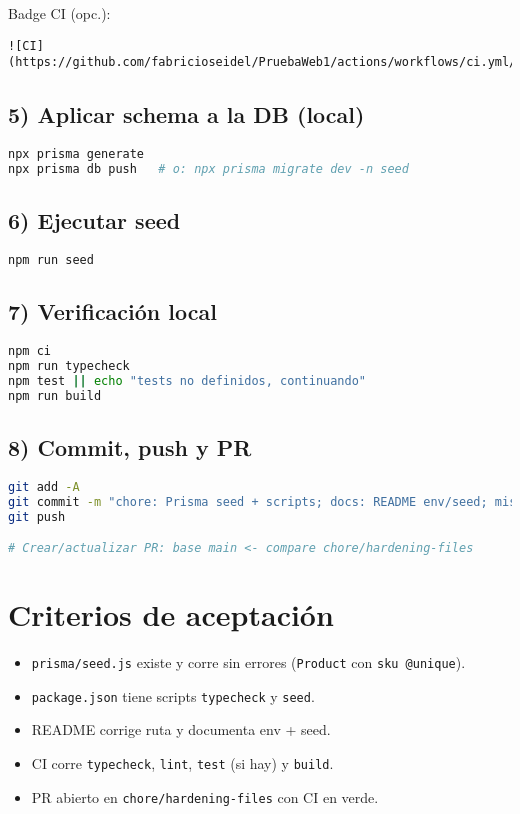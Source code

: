 \documentclass[11pt]{article}
\begin{document}
Badge CI (opc.): 
\begin{lstlisting}
![CI](https://github.com/fabricioseidel/PruebaWeb1/actions/workflows/ci.yml/badge.svg)
\end{lstlisting}

\subsection*{5) Aplicar schema a la DB (local)}
\begin{lstlisting}[language=bash]
npx prisma generate
npx prisma db push   # o: npx prisma migrate dev -n seed
\end{lstlisting}

\subsection*{6) Ejecutar seed}
\begin{lstlisting}[language=bash]
npm run seed
\end{lstlisting}

\subsection*{7) Verificación local}
\begin{lstlisting}[language=bash]
npm ci
npm run typecheck
npm test || echo "tests no definidos, continuando"
npm run build
\end{lstlisting}

\subsection*{8) Commit, push y PR}
\begin{lstlisting}[language=bash]
git add -A
git commit -m "chore: Prisma seed + scripts; docs: README env/seed; misc: typecheck"
git push

# Crear/actualizar PR: base main <- compare chore/hardening-files
\end{lstlisting}

\section*{Criterios de aceptación}
\begin{itemize}[leftmargin=*]
  \item \texttt{prisma/seed.js} existe y corre sin errores (\texttt{Product} con \texttt{sku @unique}).
  \item \texttt{package.json} tiene scripts \texttt{typecheck} y \texttt{seed}.
  \item README corrige ruta y documenta env + seed.
  \item CI corre \texttt{typecheck}, \texttt{lint}, \texttt{test} (si hay) y \texttt{build}.
  \item PR abierto en \texttt{chore/hardening-files} con CI en verde.
\end{itemize}
\end{document}
